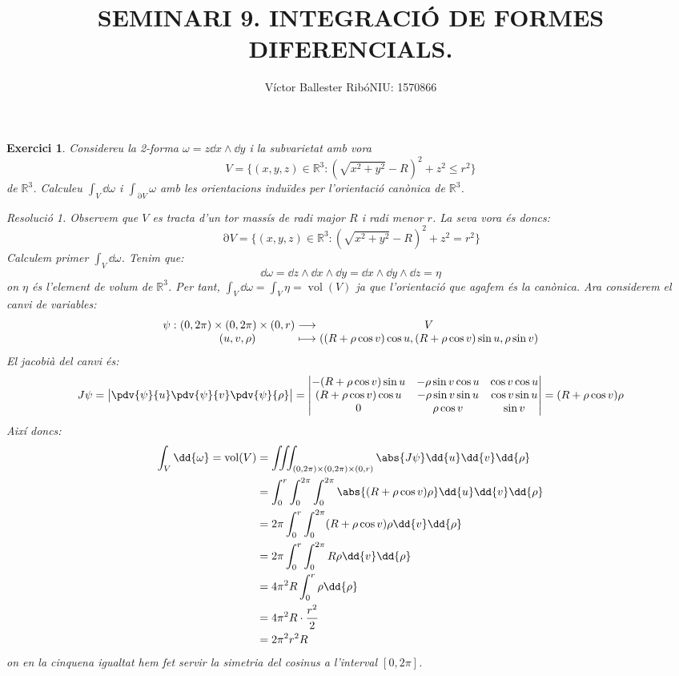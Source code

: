 \documentclass[10pt,a4paper]{article}
\title{\bfseries\large SEMINARI 9. INTEGRACIÓ DE FORMES DIFERENCIALS.}
\author{Víctor Ballester Ribó\endgraf NIU: 1570866}
\date{\parbox{\linewidth}{\centering
  Geometria diferencial\endgraf
  Grau en Matemàtiques\endgraf
  Universitat Autònoma de Barcelona\endgraf
  Juny de 2022}}
\makeatletter
\newcommand{\RR}{\ensuremath{\mathbb{R}}}
\newcommand{\function}[5]{
  \if\relax\detokenize{#1}\relax %
  \begin{array}{c@{\hspace{0.5\tabcolsep}}c@{\hspace{0.5\tabcolsep}}c}
    #2 & \longrightarrow & #3                     \\
    #4 & \longmapsto     & #5
  \end{array}
  \else %
  \begin{array}{r@{\hspace{0.5\tabcolsep}}c@{\hspace{0.5\tabcolsep}}c@{\hspace{0.5\tabcolsep}}c}
    #1: & #2 & \longrightarrow & #3                     \\
        & #4 & \longmapsto     & #5
  \end{array}
  \fi
} %
\newtheorem{exercice}{Exercici}
\theoremstyle{remark}
\newtheorem*{resolution}{Resolució}
\theoremstyle{math}
\DeclareMathOperator{\vol}{vol} %
\DeclareMathOperator{\Fr}{\partial} %
\makeatother
\begin{document}
\maketitle
\setcounter{exercice}{4}
\begin{exercice}
  Considereu la 2-forma $\omega=z\dd{x}\wedge\dd{y}$ i la subvarietat amb vora $$V=\{(x,y,z)\in\RR^3:{\left(\sqrt{x^2+y^2}-R\right)}^2+z^2\leq r^2\}$$ de $\RR^3$. Calculeu $\int_V\dd{\omega}$ i $\int_{\Fr{V}}\omega$ amb les orientacions induïdes per l'orientació canònica de $\RR^3$.
  \begin{resolution}
    Observem que $V$ es tracta d'un tor massís de radi major $R$ i radi menor $r$. La seva vora és doncs: $$\Fr{V}=\{(x,y,z)\in\RR^3:{\left(\sqrt{x^2+y^2}-R\right)}^2+z^2= r^2\}$$
    Calculem primer $\int_V\dd{\omega}$. Tenim que:
    $$\dd\omega=\dd{z}\wedge\dd{x}\wedge\dd{y}=\dd{x}\wedge\dd{y}\wedge\dd{z}=\eta$$
    on $\eta$ és l'element de volum de $\RR^3$. Per tant, $\int_V\dd{\omega}=\int_V\eta=\vol(V)$ ja que l'orientació que agafem és la canònica. Ara considerem el canvi de variables:
    $$\function{\psi}{(0,2\pi)\times(0,2\pi)\times(0,r)}{V}{(u,v,\rho)}{((R+\rho\cos v)\cos u,(R+\rho\cos v)\sin u,\rho\sin v)}$$
    El jacobià del canvi és: $$J\psi=\begin{vmatrix}
        \pdv{\psi}{u}
        \pdv{\psi}{v}
        \pdv{\psi}{\rho}
      \end{vmatrix}=\begin{vmatrix}
        -(R+\rho\cos v)\sin u & -\rho\sin v\cos u & \cos v\cos u \\
        (R+\rho\cos v)\cos u  & -\rho\sin v\sin u & \cos v\sin u \\
        0                     & \rho\cos v        & \sin v
      \end{vmatrix}=(R+\rho\cos v)\rho$$
    Així doncs:
    \begin{align*}
      \int_V\dd{\omega}=\vol(V) & =\iiint_{(0,2\pi)\times(0,2\pi)\times(0,r)}\abs{J\psi}\dd{u}\dd{v}\dd{\rho}      \\
                                & =\int_0^r\int_0^{2\pi}\int_0^{2\pi}\abs{(R+\rho\cos v)\rho}\dd{u}\dd{v}\dd{\rho} \\
                                & =2\pi\int_0^r\int_0^{2\pi}(R+\rho\cos v)\rho\dd{v}\dd{\rho}                      \\
                                & =2\pi\int_0^r\int_0^{2\pi}R\rho\dd{v}\dd{\rho}                                   \\
                                & =4\pi^2R\int_0^r \rho\dd{\rho}                                                   \\
                                & =4\pi^2R\cdot\frac{r^2}{2}                                                       \\
                                & = 2\pi^2 r^2R
    \end{align*}
    on en la cinquena igualtat hem fet servir la simetria del cosinus a l'interval $[0,2\pi]$.


\end{resolution}
\end{exercice}
\end{document}
